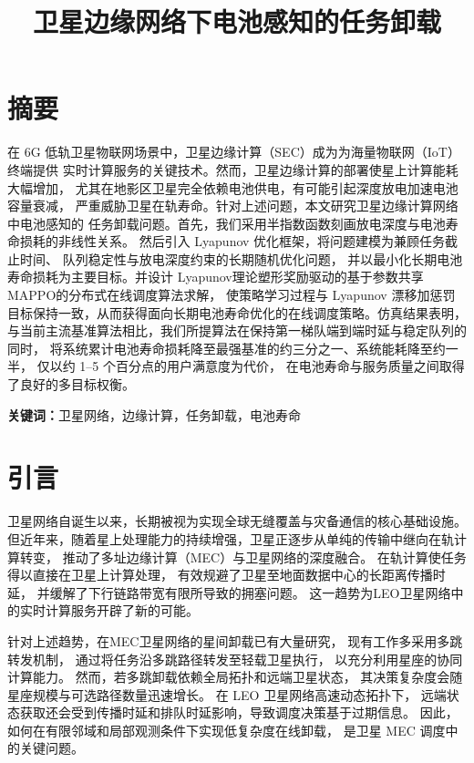 \documentclass[a4paper,11pt]{article}
\begin{document}
\title{卫星边缘网络下电池感知的任务卸载}
\author{}
\date{}
\maketitle

\section{摘要}

在 6G 低轨卫星物联网场景中，卫星边缘计算（SEC）成为为海量物联网（IoT）终端提供
实时计算服务的关键技术。然而，卫星边缘计算的部署使星上计算能耗大幅增加，
尤其在地影区卫星完全依赖电池供电，有可能引起深度放电加速电池容量衰减，
严重威胁卫星在轨寿命。针对上述问题，本文研究卫星边缘计算网络中电池感知的
任务卸载问题。首先，我们采用半指数函数刻画放电深度与电池寿命损耗的非线性关系。
然后引入 Lyapunov 优化框架，将问题建模为兼顾任务截止时间、
队列稳定性与放电深度约束的长期随机优化问题，
并以最小化长期电池寿命损耗为主要目标。并设计
Lyapunov理论塑形奖励驱动的基于参数共享MAPPO的分布式在线调度算法求解，
使策略学习过程与 Lyapunov 漂移加惩罚目标保持一致，从而获得面向长期电池寿命优化的在线调度策略。仿真结果表明，
与当前主流基准算法相比，我们所提算法在保持第一梯队端到端时延与稳定队列的同时，
将系统累计电池寿命损耗降至最强基准的约三分之一、系统能耗降至约一半，
仅以约 1--5 个百分点的用户满意度为代价，
在电池寿命与服务质量之间取得了良好的多目标权衡。

\noindent\textbf{关键词：}卫星网络，边缘计算，任务卸载，电池寿命

\section{引言}

卫星网络自诞生以来，长期被视为实现全球无缝覆盖与灾备通信的核心基础设施。
但近年来，随着星上处理能力的持续增强，卫星正逐步从单纯的传输中继向在轨计算转变，
推动了多址边缘计算（MEC）与卫星网络的深度融合\cite{zhang2024mhspo}。
在轨计算使任务得以直接在卫星上计算处理，
有效规避了卫星至地面数据中心的长距离传播时延，
并缓解了下行链路带宽有限所导致的拥塞问题。
这一趋势为LEO卫星网络中的实时计算服务开辟了新的可能。

针对上述趋势，在MEC卫星网络的星间卸载已有大量研究，
现有工作多采用多跳转发机制，
通过将任务沿多跳路径转发至轻载卫星执行，
以充分利用星座的协同计算能力\cite{zhang2024mhspo}。
然而，若多跳卸载依赖全局拓扑和远端卫星状态，
其决策复杂度会随星座规模与可选路径数量迅速增长。
在 LEO 卫星网络高速动态拓扑下，
远端状态获取还会受到传播时延和排队时延影响，导致调度决策基于过期信息。
因此，如何在有限邻域和局部观测条件下实现低复杂度在线卸载，
是卫星 MEC 调度中的关键问题\cite{2}。
\end{document}
